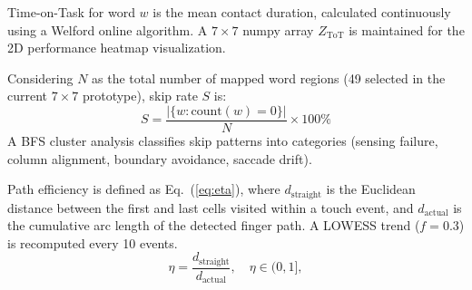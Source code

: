 \documentclass[conference]{IEEEtran}
\begin{document}

    Time-on-Task for word $w$ is the mean contact duration, calculated continuously using a Welford online algorithm.
    A $7\times7$ numpy array $Z_{\mathrm{ToT}}$ is maintained for the 2D performance heatmap visualization.


    Considering $N$ as the total number of mapped word regions (49 selected in the
    current $7\times7$ prototype), skip rate $S$ is:
    \begin{equation}
        S = \frac{|\{w : \mathrm{count}(w) = 0\}|}{N} \times 100\%
        \label{eq:skiprate}
    \end{equation}
    A BFS cluster analysis classifies skip patterns into categories
    (sensing failure, column alignment, boundary avoidance, saccade
    drift).

    Path efficiency is defined as Eq.~(\ref{eq:eta}),
    where $d_{\mathrm{straight}}$ is the Euclidean distance between the
    first and last cells visited within a touch event, and
    $d_{\mathrm{actual}}$ is the cumulative arc length of the detected
    finger path. A LOWESS trend ($f=0.3$) is recomputed every 10 events.
    \begin{equation}
        \eta = \frac{d_{\mathrm{straight}}}{d_{\mathrm{actual}}},
        \quad \eta \in (0, 1],
        \label{eq:eta}
    \end{equation}

\end{document}
